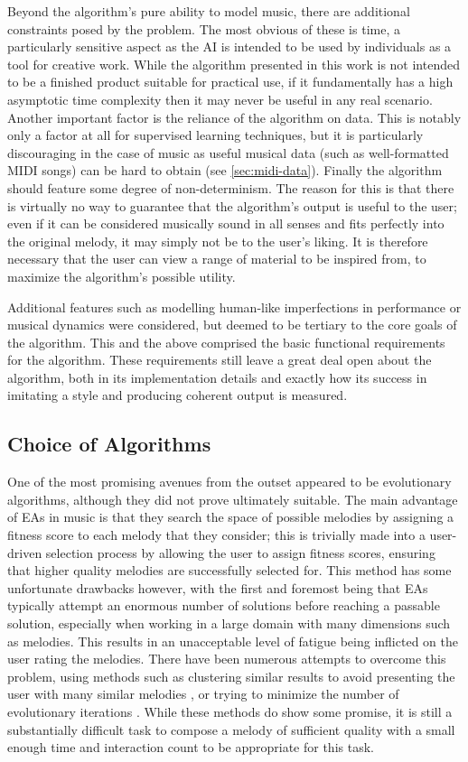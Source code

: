 \documentclass[ author={Stephen Livermore-Tozer},
				supervisor={Dr. Peter Flach},
				degree={MEng},
				title={Algorithmic Co-composition Using Machine Learning},
				subtitle={},
				type={research},
				year={2016} ]{dissertation}
\begin{document}
	Beyond the algorithm's pure ability to model music, there are additional constraints posed by the problem. The most obvious of these is time, a particularly sensitive aspect as the AI is intended to be used by individuals as a tool for creative work. While the algorithm presented in this work is not intended to be a finished product suitable for practical use, if it fundamentally has a high asymptotic time complexity then it may never be useful in any real scenario. Another important factor is the reliance of the algorithm on data. This is notably only a factor at all for supervised learning techniques, but it is particularly discouraging in the case of music as useful musical data (such as well-formatted MIDI songs) can be hard to obtain (see \ref{sec:midi-data}). Finally the algorithm should feature some degree of non-determinism. The reason for this is that there is virtually no way to guarantee that the algorithm's output is useful to the user; even if it can be considered musically sound in all senses and fits perfectly into the original melody, it may simply not be to the user's liking. It is therefore necessary that the user can view a range of material to be inspired from, to maximize the algorithm's possible utility.

	Additional features such as modelling human-like imperfections in performance or musical dynamics were considered, but deemed to be tertiary to the core goals of the algorithm. This and the above comprised the basic functional requirements for the algorithm. These requirements still leave a great deal 
	open about the algorithm, both in its implementation details and exactly how its success in imitating a style and producing coherent output is measured.

	\subsection{Choice of Algorithms}
	
	One of the most promising avenues from the outset appeared to be evolutionary algorithms, although they did not prove ultimately suitable. The main advantage of EAs in music is that they search the space of possible melodies by assigning a fitness score to each melody that they consider; this is trivially made into a user-driven selection process by allowing the user to assign fitness scores, ensuring that higher quality melodies are successfully selected for. This method has some unfortunate drawbacks however, with the first and foremost being that EAs typically attempt an enormous number of solutions before reaching a passable solution, especially when working in a large domain with many dimensions such as melodies. This results in an unacceptable level of fatigue being inflicted on the user rating the melodies. There have been numerous attempts to overcome this problem, using methods such as clustering similar results to avoid presenting the user with many similar melodies \cite{burton1998hybrid,ralley1995genetic}, or trying to minimize the number of evolutionary iterations \cite{marques2010interactive}. While these methods do show some promise, it is still a substantially difficult task to compose a melody of sufficient quality with a small enough time and interaction count to be appropriate for this task.
\end{document}
